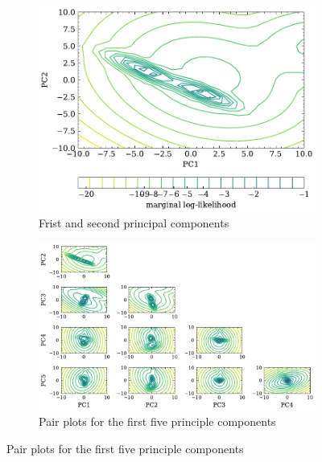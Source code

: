 \begin{figure}[htbp]
    \centering
    \begin{subfigure}[t]{\floatwidth}
        \showthe\textwidth
          \includegraphics[width=\textwidth]{5Results/figs/densityestimation/de_pc1_pc2.pdf}
          \caption{Frist and second principal components}
    \end{subfigure}
  	\begin{subfigure}[t]{\floatwidth}
  	    \includegraphics[width=\textwidth]{5Results/figs/densityestimation/de_pc_pair_plot.pdf}
  	    \caption{Pair plots for the first five principle components}
  	\end{subfigure}
    \label{fig:5results:de}
\end{figure}

